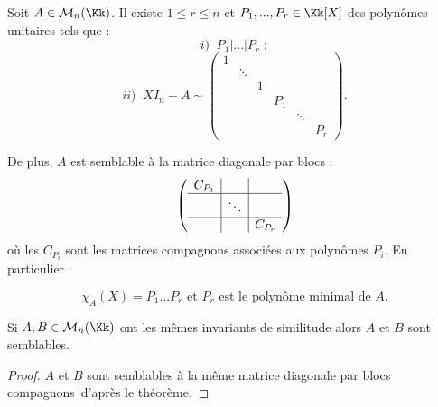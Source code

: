\documentclass[class=report,crop=false]{standalone}
\begin{document}
\begin{theoreme}\label{thm:pr}
Soit $A \in \mathcal{M}_n(\Kk)$. Il existe $1 \le r \le n$ et $P_1,...,P_r \in \Kk[X]$ des polynômes unitaires tels que :
\[i) \;\; P_1 | ... | P_r \;;\]
\[ii)\;\; XI_n-A \sim \left(\begin{array}{cccccc}
1 &&&&&\\
& \ddots&&&&\\
&&1&&&\\
&&&P_1&&\\
&&&&\ddots&\\
&&&&&P_r
\end{array}
\right) . \]

De plus, $A$ est semblable à la matrice diagonale par blocs :
\[\left(\begin{array}{c|c|c}
C_{P_1}&&\\\hline
&\ddots&\\\hline
&&C_{P_r}
\end{array}\right)\]
où les $C_{P_i}$ sont les matrices compagnons associées aux polynômes $P_i$. En particulier :

\[\chi_A(X) = P_1...P_r \text{ et } P_r \mbox{ est le polynôme minimal de $A$.}\]
\end{theoreme}

\begin{corollaire}
Si $A,B \in \mathcal{M}_n(\Kk)$ ont les mêmes invariants de similitude alors $A$ et $B$ sont semblables.
\end{corollaire}

\begin{proof}
$A$ et $B$ sont semblables à la même matrice diagonale par blocs \og compagnons\fg\ d'après le théorème. 
\end{proof}
\end{document}

